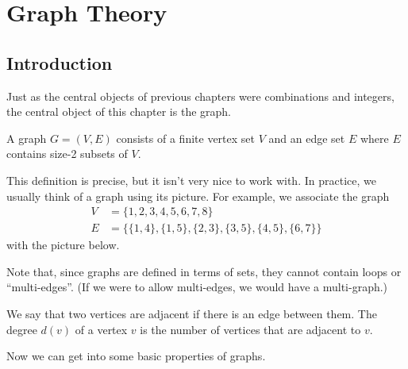 \documentclass[../m055main.tex]{subfiles}
\begin{document}
\chapter{Graph Theory}

\section{Introduction}
Just as the central objects of previous chapters were combinations and integers, the central object of this chapter is the graph.

\begin{definition}[Graph]
    A graph $G = (V,E)$ consists of a finite vertex set $V$ and an edge set $E$ where $E$ contains size-2 subsets of $V$.
\end{definition}

This definition is precise, but it isn't very nice to work with.
In practice, we usually think of a graph using its picture.
For example, we associate the graph
\begin{align*}
    V &= \{ 1, 2, 3, 4, 5, 6, 7, 8 \} \\
    E &= \Big\{ \{ 1,4 \}, \{ 1,5 \}, \{ 2,3 \}, \{ 3,5 \}, \{ 4,5 \}, \{ 6,7 \} \Big\}
\end{align*}
with the picture below.

\begin{center}
\end{center}

Note that, since graphs are defined in terms of sets, they cannot contain loops or ``multi-edges''.
(If we were to allow multi-edges, we would have a multi-graph.)

We say that two vertices are adjacent if there is an edge between them.
The degree $d(v)$ of a vertex $v$ is the number of vertices that are adjacent to $v$.

Now we can get into some basic properties of graphs.
\end{document}
